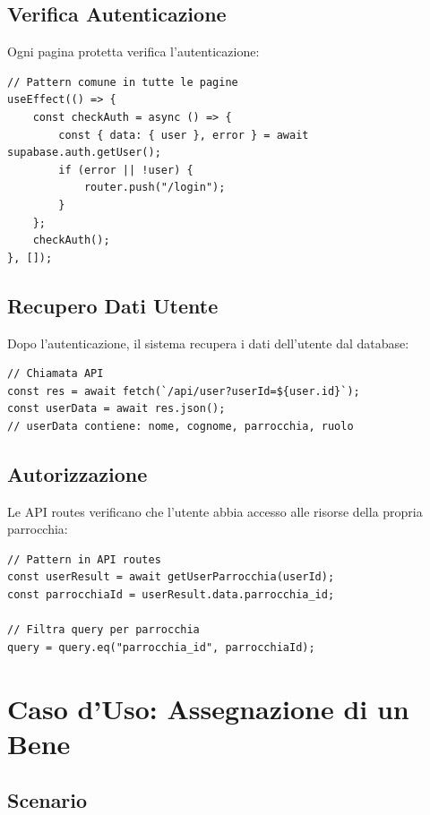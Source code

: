 \documentclass{article}
\begin{document}
\subsection{Verifica Autenticazione}

Ogni pagina protetta verifica l'autenticazione:

\begin{lstlisting}
// Pattern comune in tutte le pagine
useEffect(() => {
    const checkAuth = async () => {
        const { data: { user }, error } = await supabase.auth.getUser();
        if (error || !user) {
            router.push("/login");
        }
    };
    checkAuth();
}, []);
\end{lstlisting}

\subsection{Recupero Dati Utente}

Dopo l'autenticazione, il sistema recupera i dati dell'utente dal database:

\begin{lstlisting}
// Chiamata API
const res = await fetch(`/api/user?userId=${user.id}`);
const userData = await res.json();
// userData contiene: nome, cognome, parrocchia, ruolo
\end{lstlisting}

\subsection{Autorizzazione}

Le API routes verificano che l'utente abbia accesso alle risorse della propria parrocchia:

\begin{lstlisting}
// Pattern in API routes
const userResult = await getUserParrocchia(userId);
const parrocchiaId = userResult.data.parrocchia_id;

// Filtra query per parrocchia
query = query.eq("parrocchia_id", parrocchiaId);
\end{lstlisting}

\section{Caso d'Uso: Assegnazione di un Bene}

\subsection{Scenario}
\end{document}
